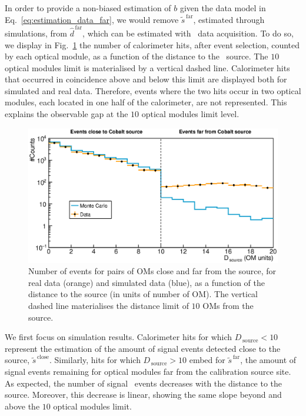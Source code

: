 In order to provide a non-biased estimation of $b$ given the data model in Eq.~\eqref{eq:estimation_data_far}, we would remove $\tilde{s}^{\,\text{far}}$, estimated through simulations, from $\hat{d}^{\,\text{far}}$, which can be estimated with \Co\ data acquisition.
To do so, we display in Fig.~\ref{fig:Co_data_bkg} the number of calorimeter hits, after event selection, counted by each optical module, as a function of the distance to the \Co\ source.
The $10$ optical modules limit is materialised by a vertical dashed line.
Calorimeter hits that occurred in coincidence above and below this limit are displayed both for simulated and real data.
Therefore, events where the two hits occur in two optical modules, each located in one half of the calorimeter, are not represented.
This explains the observable gap at the $10$ optical modules limit level.
\begin{figure}[h]
  \centering
  \includegraphics[width=1.1\textwidth]{commissioning/fig_commissioning/Co_data_bkg.eps}
  \caption{Number of events for pairs of OMs close and far from the source, for real data (orange) and simulated data (blue), as a function of the distance to the source (in units of number of OM).
    The vertical dashed line materialises the distance limit of $10$ OMs from the source.
    \label{fig:Co_data_bkg}}
\end{figure}

We first focus on simulation results.
Calorimeter hits for which $D_{\,\text{source}}<10$ represent the estimation of the amount of signal events detected close to the source, $\tilde{s}^{\,\text{close}}$.
Similarly, hits for which $D_{\,\text{source}}>10$ embed for $\tilde{s}^{\,\text{far}}$, the amount of signal events remaining for optical modules far from the calibration source site.
As expected, the number of signal \Co\ events decreases with the distance to the source.
Moreover, this decrease is linear, showing the same slope beyond and above the $10$ optical modules limit.


